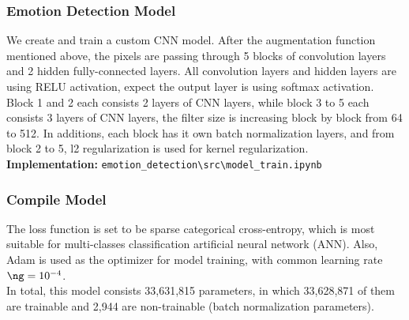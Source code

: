 \documentclass[11pt,a4paper]{article}
\begin{document}
    \subsubsection{Emotion Detection Model}
    We create and train a custom CNN model. After the augmentation function mentioned above, the pixels are passing through 5 blocks of convolution layers and 2 hidden fully-connected layers. All convolution layers and hidden layers  are using RELU activation, expect the output layer is using softmax activation. \\
    Block 1 and 2 each consists 2 layers of CNN layers, while block 3 to 5 each consists 3 layers of CNN layers, the filter size is increasing block by block from 64 to 512. In additions, each block has it own batch normalization layers, and from block 2 to 5, l2 regularization is used for kernel regularization. \\
    \textbf{Implementation:} \texttt{emotion\_detection\textbackslash src\textbackslash model\_train.ipynb}
    
    \subsubsection{Compile Model}
    The loss function is set to be sparse categorical cross-entropy, which is most suitable for multi-classes classification artificial neural network (ANN). Also, Adam is used as the optimizer for model training, with common learning rate $\ng = 10^{-4}$. \\
    In total, this model consists 33,631,815 parameters, in which 33,628,871 of them are trainable and 2,944 are non-trainable (batch normalization parameters).
    
\end{document}
